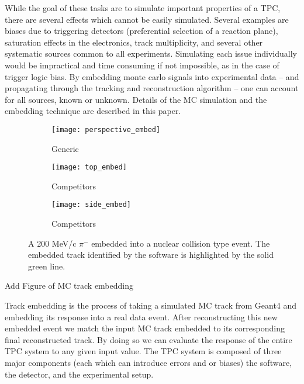 While the goal of these tasks are to simulate important properties of a TPC, there are several effects which cannot be easily simulated. Several examples are biases due to triggering detectors (preferential selection of a reaction plane), saturation effects in the electronics, track multiplicity, and several other systematic sources common to all experiments. Simulating each issue individually would be impractical and time consuming if not impossible, as in the case of trigger logic bias. By embedding monte carlo signals into experimental data -- and propagating through the tracking and reconstruction algorithm -- one can account for all sources, known or unknown. Details of the MC simulation and the embedding technique are described in this paper. 




\begin{figure}[!htb]
    \centering
    \begin{subfigure}[t]{0.49\textwidth}
        \centering
        \texttt{[image: perspective\_embed]}
        \caption{Generic} \label{fig:persEmbed}
    \end{subfigure}
    \hfill
    \begin{subfigure}[t]{.3\textwidth}
        \centering
        \texttt{[image: top\_embed]} 
        \caption{Competitors} \label{fig:topEmbed}
    \end{subfigure}
     \hfill
    \begin{subfigure}[t]{\textwidth}
        \centering
        \texttt{[image: side\_embed]} 
        \caption{Competitors} \label{fig:sideEmbed}
    \end{subfigure}
    \caption{A 200 MeV/c $\pi^-$ embedded into a nuclear collision type event. The embedded track identified by the software is highlighted by the solid green line. }

\label{fig:embedtrack}
\end{figure}










Add Figure of MC track embedding 



Track embedding is the process of taking a simulated MC track from Geant4 and embedding its response into a real data event. After reconstructing this new embedded event we match the input MC track embedded to its corresponding final reconstructed track.  By doing so we can evaluate the response of the entire TPC system to any given input value. The TPC system is composed of three major components (each which can introduce errors and or biases) the software, the detector, and the experimental setup.  

